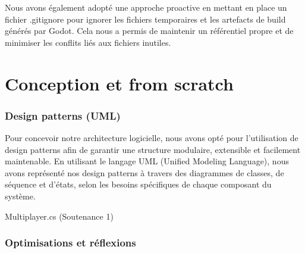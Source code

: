 \documentclass[
	article,			%
	11pt,				%
	oneside,			%
	a4paper,			%
	chapter=TITLE,
	french,			%
	sumario=tradicional
	]{base_nt}
\begin{document}
Nous avons également adopté une approche proactive en mettant en place un fichier .gitignore pour ignorer les fichiers temporaires et les artefacts de build générés par Godot. Cela nous a permis de maintenir un référentiel propre et de minimiser les conflits liés aux fichiers inutiles.

\part{Conception et from scratch}

\section{Design patterns (UML)}

Pour concevoir notre architecture logicielle, nous avons opté pour l'utilisation de design patterns afin de garantir une structure modulaire, extensible et facilement maintenable. En utilisant le langage UML (Unified Modeling Language), nous avons représenté nos design patterns à travers des diagrammes de classes, de séquence et d'états, selon les besoins spécifiques de chaque composant du système.

Multiplayer.cs (Soutenance 1)


\section{Optimisations et réflexions}
\end{document}
